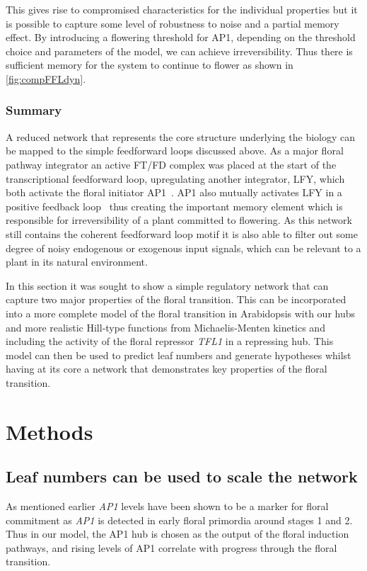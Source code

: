 This gives rise to compromised characteristics for the individual properties but it is possible to capture some level of robustness to noise and a partial memory effect.
By introducing a flowering threshold for AP1, depending on the threshold choice and parameters of the model, we can achieve irreversibility.
Thus there is sufficient memory for the system to continue to flower as shown in \autoref{fig:compFFLdyn}.

\subsubsection{Summary}

A reduced network that represents the core structure underlying the biology can be mapped to the simple feedforward loops discussed above.
As a major floral pathway integrator an active FT/FD complex was placed at the start of the transcriptional feedforward loop, upregulating another integrator, LFY, which both activate the floral initiator AP1~\cite{wagner1999}.
AP1 also mutually activates LFY in a positive feedback loop~\cite{ratcliffe1999,kaufmann2010} thus creating the important memory element which is responsible for irreversibility of a plant committed to flowering.
As this network still contains the coherent feedforward loop motif it is also able to filter out some degree of noisy endogenous or exogenous input signals, which can be relevant to a plant in its natural environment.

In this section it was sought to show a simple regulatory network that can capture two major properties of the floral transition.
This can be incorporated into a more complete model of the floral transition in Arabidopsis with our hubs and more realistic Hill-type functions from Michaelis-Menten kinetics and including the activity of the floral repressor \emph{TFL1} in a repressing hub.
This model can then be used to predict leaf numbers and generate hypotheses whilst having at its core a network that demonstrates key properties of the floral transition.

\section{Methods}

\subsection{Leaf numbers can be used to scale the network}
\label{sec:scaling}
As mentioned earlier \emph{AP1} levels have been shown to be a marker for floral commitment as \emph{AP1} is detected in early floral primordia around stages 1 and 2\cite{mandel1992,hempel1997}.
Thus in our model, the AP1 hub is chosen as the output of the floral induction pathways, and rising levels of AP1 correlate with progress through the floral transition.

